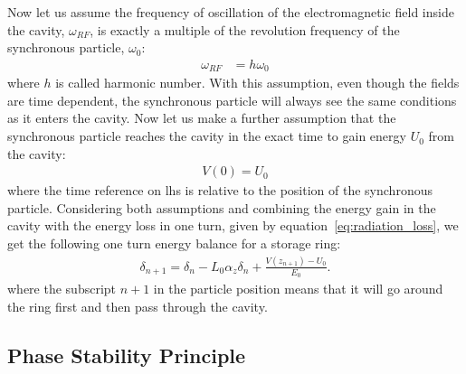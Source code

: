 	Now let us assume the frequency of oscillation of the electromagnetic field inside the cavity, $\omega_{RF}$, is exactly a multiple of the revolution frequency of the synchronous particle, $\omega_0$:
	\begin{align}\label{eq:harmonic_number}
		\omega_{RF} &= h\omega_0
	\end{align}
	where $h$ is called harmonic number. With this assumption, even though the fields are time dependent, the synchronous particle will always see the same conditions as it enters the cavity. Now let us make a further assumption that the synchronous particle reaches the cavity in the exact time to gain energy $U_0$ from the cavity:
	\begin{align}\label{eq:synchronous_phase_condition}
		V(0) = U_0
	\end{align}
	where the time reference on \gls{lhs} is relative to the position of the synchronous particle. Considering both assumptions and combining the energy gain in the cavity with the energy loss in one turn, given by equation~\eqref{eq:radiation_loss}, we get the following one turn energy balance for a storage ring:
	\begin{align}\label{eq:energy_balance}
		\delta_{n+1} = \delta_n - L_0\alpha_z\delta_n + \frac{V(z_{n+1})-U_0}{E_0}.
	\end{align}
	where the subscript $n+1$ in the particle position means that it will go around the ring first and then pass through the cavity.

\subsection{Phase Stability Principle}

